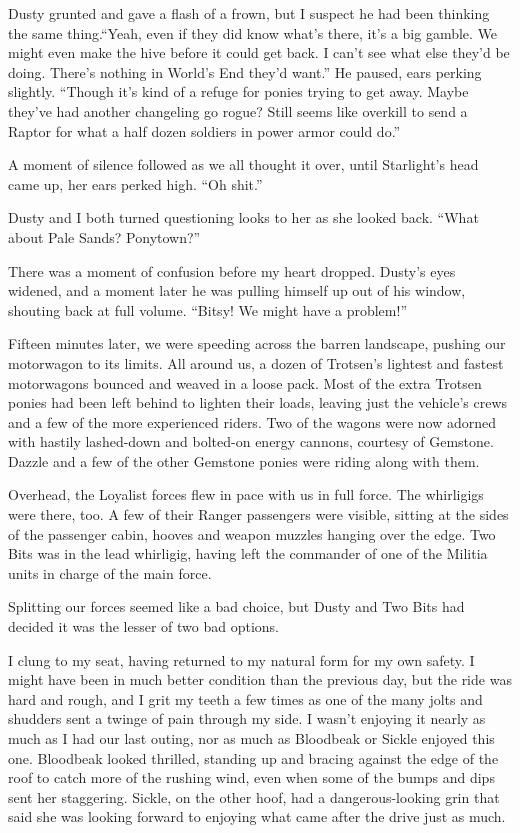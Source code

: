 Dusty grunted and gave a flash of a frown, but I suspect he had been thinking the same thing.“Yeah, even if they did know what’s there, it’s a big gamble. We might even make the hive before it could get back. I can’t see what else they’d be doing. There’s nothing in World’s End they’d want.” He paused, ears perking slightly. “Though it’s kind of a refuge for ponies trying to get away. Maybe they’ve had another changeling go rogue? Still seems like overkill to send a Raptor for what a half dozen soldiers in power armor could do.”

A moment of silence followed as we all thought it over, until Starlight’s head came up, her ears perked high. “Oh shit.”

Dusty and I both turned questioning looks to her as she looked back. “What about Pale Sands? Ponytown?”

There was a moment of confusion before my heart dropped. Dusty’s eyes widened, and a moment later he was pulling himself up out of his window, shouting back at full volume. “Bitsy! We might have a problem!”

{\br}%
Fifteen minutes later, we were speeding across the barren landscape, pushing our motorwagon to its limits. All around us, a dozen of Trotsen’s lightest and fastest motorwagons bounced and weaved in a loose pack. Most of the extra Trotsen ponies had been left behind to lighten their loads, leaving just the vehicle’s crews and a few of the more experienced riders. Two of the wagons were now adorned with hastily lashed-down and bolted-on energy cannons, courtesy of Gemstone. Dazzle and a few of the other Gemstone ponies were riding along with them.

Overhead, the Loyalist forces flew in pace with us in full force. The whirligigs were there, too. A few of their Ranger passengers were visible, sitting at the sides of the passenger cabin, hooves and weapon muzzles hanging over the edge. Two Bits was in the lead whirligig, having left the commander of one of the Militia units in charge of the main force.

Splitting our forces seemed like a bad choice, but Dusty and Two Bits had decided it was the lesser of two bad options.

I clung to my seat, having returned to my natural form for my own safety. I might have been in much better condition than the previous day, but the ride was hard and rough, and I grit my teeth a few times as one of the many jolts and shudders sent a twinge of pain through my side. I wasn’t enjoying it nearly as much as I had our last outing, nor as much as Bloodbeak or Sickle enjoyed this one. Bloodbeak looked thrilled, standing up and bracing against the edge of the roof to catch more of the rushing wind, even when some of the bumps and dips sent her staggering. Sickle, on the other hoof, had a dangerous-looking grin that said she was looking forward to enjoying what came after the drive just as much.

